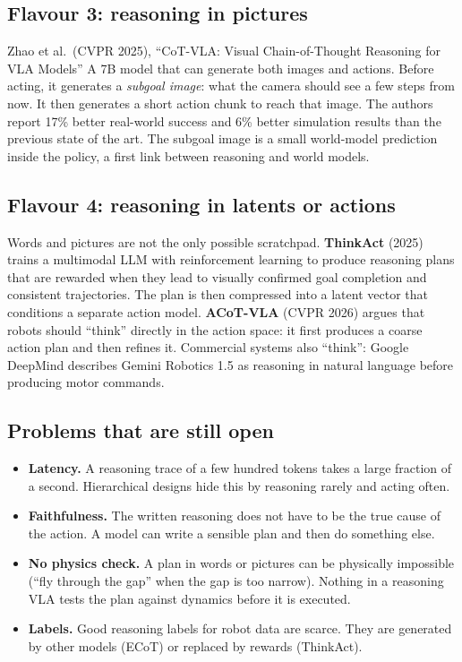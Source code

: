 \subsection{Flavour 3: reasoning in pictures}
\begin{paperbox}{Zhao et al.\ (CVPR 2025), ``CoT-VLA: Visual Chain-of-Thought Reasoning for VLA Models''}
A 7B model that can generate both images and actions. Before acting, it generates a \emph{subgoal image}: what the camera should see a few steps from now. It then generates a short action chunk to reach that image. The authors report 17\% better real-world success and 6\% better simulation results than the previous state of the art. The subgoal image is a small world-model prediction inside the policy, a first link between reasoning and world models.
\end{paperbox}

\subsection{Flavour 4: reasoning in latents or actions}
Words and pictures are not the only possible scratchpad. \textbf{ThinkAct} (2025) trains a multimodal LLM with reinforcement learning to produce reasoning plans that are rewarded when they lead to visually confirmed goal completion and consistent trajectories. The plan is then compressed into a latent vector that conditions a separate action model. \textbf{ACoT-VLA} (CVPR 2026) argues that robots should ``think'' directly in the action space: it first produces a coarse action plan and then refines it. Commercial systems also ``think'': Google DeepMind describes Gemini Robotics 1.5 as reasoning in natural language before producing motor commands.

\subsection{Problems that are still open}
\begin{watchbox}
\begin{itemize}[leftmargin=*]
\item \textbf{Latency.} A reasoning trace of a few hundred tokens takes a large fraction of a second. Hierarchical designs hide this by reasoning rarely and acting often.
\item \textbf{Faithfulness.} The written reasoning does not have to be the true cause of the action. A model can write a sensible plan and then do something else.
\item \textbf{No physics check.} A plan in words or pictures can be physically impossible (``fly through the gap'' when the gap is too narrow). Nothing in a reasoning VLA tests the plan against dynamics before it is executed.
\item \textbf{Labels.} Good reasoning labels for robot data are scarce. They are generated by other models (ECoT) or replaced by rewards (ThinkAct).
\end{itemize}
\end{watchbox}

